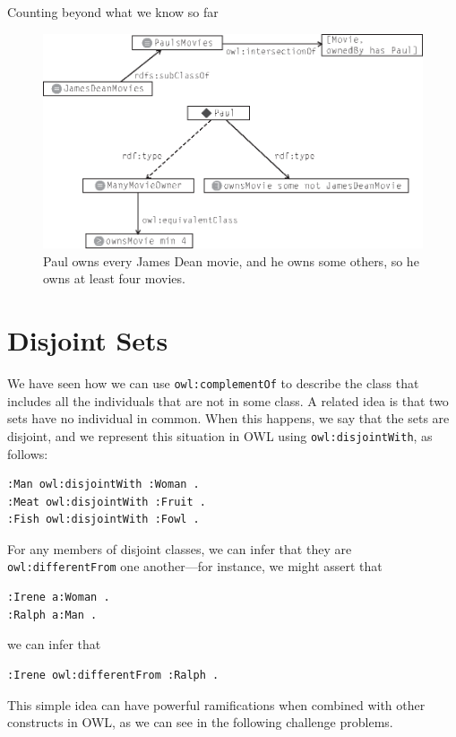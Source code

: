 \begin{challenge}{Counting beyond what we know so far}
\begin{figure}
\centering
\includegraphics[width=5in]{media/ch13/f13-05.eps}
\caption{Paul owns every James Dean movie, and he owns some others, so he owns at
least four movies.
}
\label{fig:ch13.05}
\end{figure}

\end{challenge}

\section{Disjoint Sets}

We have seen how we can use \texttt{owl:complementOf} to describe the class that
includes all the individuals that are not in some class. A related idea
is that two sets have no individual in common. When this happens, we say
that the sets are disjoint, and we represent this situation in OWL using
\texttt{owl:disjointWith}, as follows:

\begin{lstlisting}
:Man owl:disjointWith :Woman .
:Meat owl:disjointWith :Fruit .
:Fish owl:disjointWith :Fowl .
\end{lstlisting}

For any members of disjoint classes, we can infer that they are
\texttt{owl:differentFrom} one another---for instance, we might assert that

\begin{lstlisting}
:Irene a:Woman .
:Ralph a:Man .
\end{lstlisting}

we can infer that

\begin{lstlisting}
:Irene owl:differentFrom :Ralph .
\end{lstlisting}

This simple idea can have powerful ramifications when combined with
other constructs in OWL, as we can see in the following challenge
problems.


